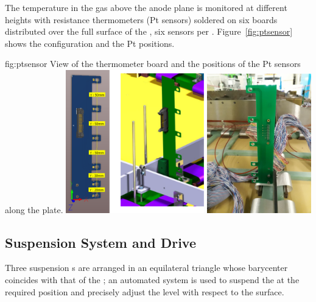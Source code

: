 The temperature in the gas above the anode plane is monitored at different heights with resistance thermometers (Pt sensors) soldered on  six  boards distributed over the full surface of the , six 
sensors per . Figure~\ref{fig:ptsensor} shows the configuration and the Pt positions.

\begin{dunefigure}{fig:ptsensor}
{View of the thermometer board and the positions of the Pt sensors along the  plate.}
\includegraphics[width=0.45\textwidth]{graphics/ptsensor}
\includegraphics[width=0.34\textwidth]{graphics/ptsensor-crp}
\end{dunefigure}


\subsection{Suspension System and Drive}
\label{sec:fddp-crp-suspension}

Three suspension \fdth{}s are arranged in an equilateral triangle whose barycenter coincides with that of the ; an automated system is used to suspend the  at the required position and precisely adjust the  level with respect to the  surface.

